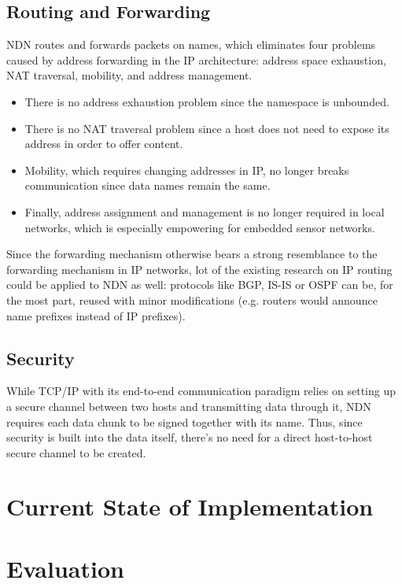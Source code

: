         \subsection{Routing and Forwarding}
            NDN routes and forwards packets on names, which eliminates four problems caused by address forwarding in the IP architecture: address space exhaustion, NAT traversal, mobility, and address management.
            \begin{itemize}
                \item There is no address exhaustion problem since the namespace is unbounded.
                \item There is no NAT traversal problem since a host does not need to expose its address in order to offer content.
                \item Mobility, which requires changing addresses in IP, no longer breaks communication since data names remain the same.
                \item Finally, address assignment and management is no longer required in local networks, which is especially empowering for embedded sensor networks.
            \end{itemize}

            Since the forwarding mechanism otherwise bears a strong resemblance to the forwarding mechanism in IP networks, lot of the existing research on IP routing could be applied to NDN as well: protocols like BGP, IS-IS or OSPF can be, for the most part, reused with minor modifications (e.g. routers would announce name prefixes instead of IP prefixes).

        \subsection{Security}
            While TCP/IP with its end-to-end communication paradigm relies on setting up a secure channel between two hosts and transmitting data through it, NDN requires each data chunk to be signed together with its name. Thus, since security is built into the data itself, there's no need for a direct host-to-host secure channel to be created.

    \section{Current State of Implementation}

    \section{Evaluation}

